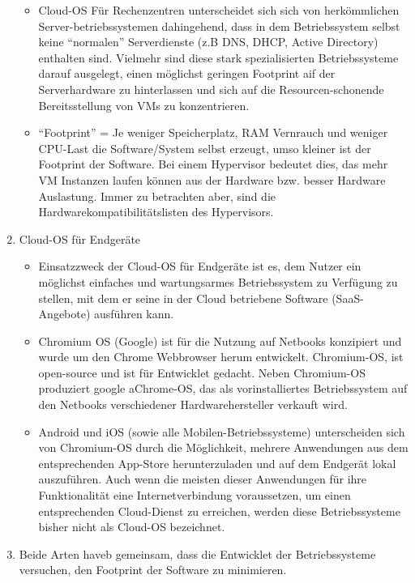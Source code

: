 \documentclass[a4paper,10pt]{article}
\begin{document}
\begin{enumerate}
\begin{itemize}
			\item Cloud-OS Für Rechenzentren unterscheidet sich sich von herkömmlichen Server-betriebssystemen dahingehend, dass in dem Betriebssystem selbst keine ``normalen'' Serverdienste (z.B DNS, DHCP, Active Directory) enthalten sind. Vielmehr sind diese stark spezialisierten Betriebssysteme darauf ausgelegt, einen möglichst geringen Footprint aif der Serverhardware zu hinterlassen und sich auf die Resourcen-schonende Bereitsstellung von VMs zu konzentrieren.
			\item ``Footprint'' = Je weniger Speicherplatz, RAM Vernrauch und weniger CPU-Last die Software/System selbst erzeugt, umso kleiner ist der Footprint der Software. Bei einem Hypervisor bedeutet dies, das mehr VM Instanzen laufen können aus der Hardware bzw. besser Hardware Auslastung. Immer zu betrachten aber, sind die Hardwarekompatibilitätslisten des Hypervisors.
		\end{itemize}

	\item Cloud-OS für Endgeräte
		\begin{itemize}
			\item Einsatzzweck der Cloud-OS für Endgeräte ist es, dem Nutzer ein möglichst einfaches und wartungsarmes Betriebssystem zu Verfügung zu stellen, mit dem er seine in der Cloud betriebene Software (SaaS-Angebote) ausführen kann.
			\item Chromium OS (Google) ist für die Nutzung auf Netbooks konzipiert und wurde um den Chrome Webbrowser herum entwickelt. Chromium-OS, ist open-source und ist für Entwicklet gedacht. Neben Chromium-OS produziert google aChrome-OS, das als vorinstalliertes Betriebssystem auf den Netbooks verschiedener Hardwarehersteller verkauft wird.
			\item Android und iOS (sowie alle Mobilen-Betriebssysteme) unterscheiden sich von Chromium-OS durch die Möglichkeit, mehrere Anwendungen aus dem entsprechenden App-Store herunterzuladen und auf dem Endgerät lokal auszuführen. Auch wenn die meisten dieser Anwendungen für ihre Funktionalität eine Internetverbindung voraussetzen, um einen entsprechenden Cloud-Dienst zu erreichen, werden diese Betriebssysteme bisher nicht als Cloud-OS bezeichnet.
		\end{itemize}


	\item Beide Arten haveb gemeinsam, dass die Entwicklet der Betriebssysteme versuchen, den Footprint der Software zu minimieren.
\end{enumerate}
\end{document}
